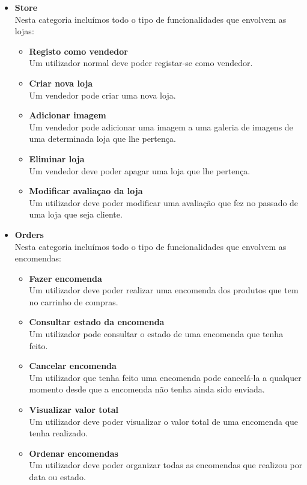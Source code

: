 \begin{itemize}
  \newpage

  \item \textbf{Store} \\
  Nesta categoria incluímos todo o tipo de funcionalidades que envolvem as lojas:
  \begin{itemize}
    
    \item \textbf{Registo como vendedor}\\ Um utilizador normal deve poder registar-se como vendedor.
    \item \textbf{Criar nova loja}\\ Um vendedor pode criar uma nova loja.
    \item \textbf{Adicionar imagem}\\ Um vendedor pode adicionar uma imagem a uma galeria de imagens de uma determinada loja que lhe pertença.
    \item \textbf{Eliminar loja}\\ Um vendedor deve poder apagar uma loja que lhe pertença.
    \item \textbf{Modificar avaliaçao da loja}\\ Um utilizador deve poder modificar uma avaliação que fez no passado de uma loja que seja cliente.
\end{itemize}

\vspace{6pt}

\item \textbf{Orders} \\
Nesta categoria incluímos todo o tipo de funcionalidades que envolvem as encomendas:
\begin{itemize}
  \item \textbf{Fazer encomenda}\\ Um utilizador deve poder realizar uma encomenda dos produtos que tem no carrinho de compras.
  \item \textbf{Consultar estado da encomenda}\\ Um utilizador pode consultar o estado de uma encomenda que tenha feito.
  \item \textbf{Cancelar encomenda}\\ Um utilizador que tenha feito uma encomenda pode cancelá-la a qualquer momento desde que a encomenda não tenha ainda sido enviada.
  \item \textbf{Visualizar valor total}\\ Um utilizador deve poder visualizar o valor total de uma encomenda que tenha realizado.
  \item \textbf{Ordenar encomendas}\\ Um utilizador deve poder organizar todas as encomendas que realizou por data ou estado.
\end{itemize}
\end{itemize}